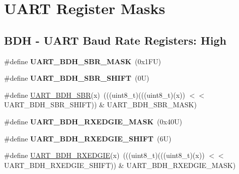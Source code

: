 \hypertarget{group___u_a_r_t___register___masks}{}\section{U\+A\+RT Register Masks}
\label{group___u_a_r_t___register___masks}
\subsection*{B\+DH -\/ U\+A\+RT Baud Rate Registers\+: High}
\begin{DoxyCompactItemize}
\item 
\mbox{\label{group___u_a_r_t___register___masks_ga2680dc8176b0c933b4a1b77c5dbb64b7}} 
\#define {\bfseries U\+A\+R\+T\+\_\+\+B\+D\+H\+\_\+\+S\+B\+R\+\_\+\+M\+A\+SK}~(0x1\+F\+U)
\item 
\mbox{\label{group___u_a_r_t___register___masks_gac38d8a98be282d97c4837597a6c02cda}} 
\#define {\bfseries U\+A\+R\+T\+\_\+\+B\+D\+H\+\_\+\+S\+B\+R\+\_\+\+S\+H\+I\+FT}~(0\+U)
\item 
\#define \mbox{\hyperlink{group___u_a_r_t___register___masks_ga7d337242135cdbd812b7da47758fbdb6}{U\+A\+R\+T\+\_\+\+B\+D\+H\+\_\+\+S\+BR}}(x)~(((uint8\+\_\+t)(((uint8\+\_\+t)(x)) $<$$<$ U\+A\+R\+T\+\_\+\+B\+D\+H\+\_\+\+S\+B\+R\+\_\+\+S\+H\+I\+FT)) \& U\+A\+R\+T\+\_\+\+B\+D\+H\+\_\+\+S\+B\+R\+\_\+\+M\+A\+SK)
\item 
\mbox{\label{group___u_a_r_t___register___masks_ga0882debd8f2c52d4ab8461b22b6519d9}} 
\#define {\bfseries U\+A\+R\+T\+\_\+\+B\+D\+H\+\_\+\+R\+X\+E\+D\+G\+I\+E\+\_\+\+M\+A\+SK}~(0x40\+U)
\item 
\mbox{\label{group___u_a_r_t___register___masks_ga97c5d15ae3144492e364744236aa10f7}} 
\#define {\bfseries U\+A\+R\+T\+\_\+\+B\+D\+H\+\_\+\+R\+X\+E\+D\+G\+I\+E\+\_\+\+S\+H\+I\+FT}~(6\+U)
\item 
\#define \mbox{\hyperlink{group___u_a_r_t___register___masks_ga2f219c309508a7b5a350e2b5cdb1f0bf}{U\+A\+R\+T\+\_\+\+B\+D\+H\+\_\+\+R\+X\+E\+D\+G\+IE}}(x)~(((uint8\+\_\+t)(((uint8\+\_\+t)(x)) $<$$<$ U\+A\+R\+T\+\_\+\+B\+D\+H\+\_\+\+R\+X\+E\+D\+G\+I\+E\+\_\+\+S\+H\+I\+FT)) \& U\+A\+R\+T\+\_\+\+B\+D\+H\+\_\+\+R\+X\+E\+D\+G\+I\+E\+\_\+\+M\+A\+SK)
\end{DoxyCompactItemize}

